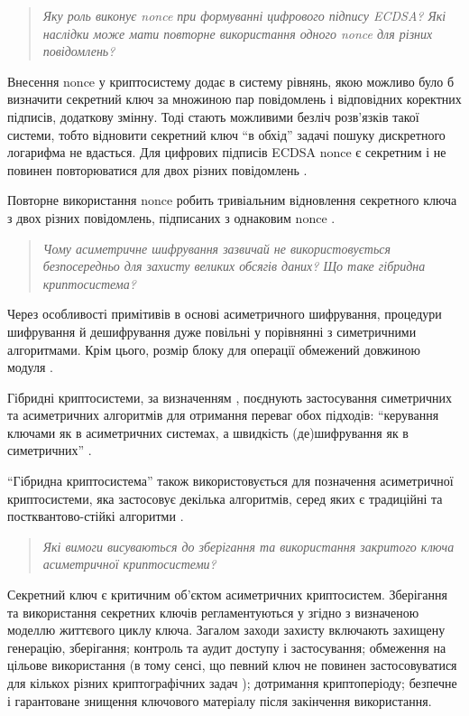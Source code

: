\documentclass{kpi-lab}
\begin{document}
\begin{quote}\small\it
  Яку роль виконує nonce при формуванні цифрового підпису
  ECDSA? Які наслідки може мати повторне використання
  одного nonce для різних повідомлень?
\end{quote}

Внесення nonce у криптосистему додає в систему рівнянь,
якою можливо було б визначити секретний ключ за множиною
пар  повідомлень і відповідних коректних підписів,
додаткову змінну.
Тоді стають можливими безліч розв'язків такої системи,
тобто відновити секретний ключ \enquote{в обхід} задачі
пошуку дискретного логарифма не вдасться.
Для цифрових підписів ECDSA nonce є секретним і не повинен
повторюватися для двох різних повідомлень
\cite{10.1007/3-540-39568-7_2}.

Повторне використання nonce робить тривіальним відновлення
секретного ключа з двох різних повідомлень, підписаних з
однаковим nonce \cite{cryptoeprint:2025/654}.

\begin{quote}\small\it
  Чому асиметричне шифрування зазвичай не використовується
  безпосередньо для захисту великих обсягів даних? Що таке
  гібридна криптосистема?
\end{quote}

Через особливості примітивів в основі асиметричного шифрування,
процедури шифрування й дешифрування дуже повільні у порівнянні з
симетричними алгоритмами. Крім цього, розмір блоку для
операції обмежений довжиною модуля \cite{nist-sp-800-56br2}.

Гібридні криптосистеми, за визначенням \cite{rfc4949}, поєднують
застосування симетричних та асиметричних алгоритмів
для отримання переваг обох підходів: \enquote{керування
  ключами як в асиметричних системах, а швидкість
(де)шифрування як в симетричних} \cite{rfc9180}.

\enquote{Гібридна криптосистема} також використовується для позначення
асиметричної криптосистеми, яка застосовує декілька
алгоритмів, серед яких є традиційні та постквантово-стійкі
алгоритми \cite{MECANISMES-CRYPTO-1.0}.

\begin{quote}\small\it
  Які вимоги висуваються до зберігання та використання
  закритого ключа асиметричної криптосистеми?
\end{quote}

Секретний ключ є критичним об'єктом асиметричних криптосистем.
Зберігання та використання секретних ключів регламентуються
у \cite{nist-sp-800-57pt1r5} згідно з визначеною моделлю
життєвого циклу ключа. Загалом заходи захисту включають
захищену генерацію, зберігання; контроль та аудит доступу і
застосування;
обмеження на цільове використання (в тому сенсі, що певний
  ключ не повинен застосовуватися для кількох різних
криптографічних задач \cite{MECANISMES-CRYPTO-1.0});
дотримання криптоперіоду;
безпечне і гарантоване знищення ключового  матеріалу після
закінчення використання.
\end{document}
